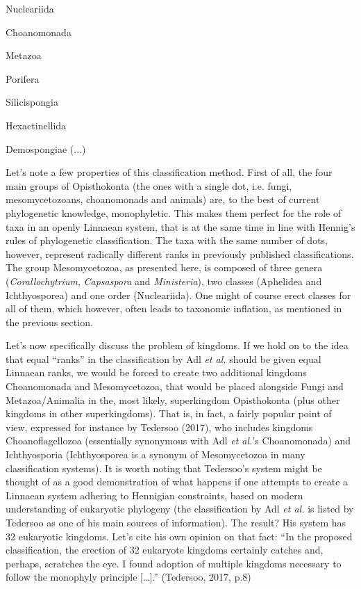 \begin{artengenv}
 Nucleariida

 Choanomonada

 Metazoa

 Porifera

 Silicispongia

 Hexactinellida

 Demospongiae (...)

Let’s note a few properties of this classification method. First of all, the four main groups of Opisthokonta
(the ones with a single dot, i.e. fungi, mesomycetozoans, choanomonads and animals) are, to the best of current
phylogenetic knowledge, monophyletic. This makes them perfect for the role of taxa in an openly Linnaean system, that
is at the same time in line with Hennig’s rules of phylogenetic classification. The taxa with the same number of dots,
however, represent radically different ranks in previously published classifications. The group Mesomycetozoa, as
presented here, is composed of three genera (\textit{Corallochytrium}, \textit{Capsaspora} and \textit{Ministeria}),
two classes (Aphelidea and Ichthyosporea) and one order (Nucleariida). One might of course erect classes for all of
them, which however, often leads to taxonomic inflation, as mentioned in the previous section.

Let’s now specifically discuss the problem of kingdoms. If we hold on to the idea that equal “ranks” in the
classification by Adl \textit{et al.} should be given equal Linnaean ranks, we would be forced to create two additional
kingdoms Choanomonada and Mesomycetozoa, that would be placed alongside Fungi and Metazoa/Animalia in the, most likely,
superkingdom Opisthokonta (plus other kingdoms in other superkingdoms). That is, in fact, a fairly popular point of
view, expressed for instance by Tedersoo \label{ref:RNDXAoIqIPayD}(2017), who includes kingdoms Choanoflagellozoa
(essentially synonymous with Adl \textit{et al.}’s Choanomonada) and Ichthyosporia (Ichthyosporea is a synonym of
Mesomycetozoa in many classification systems). It is worth noting that Tedersoo’s system might be thought of as a good
demonstration of what happens if one attempts to create a Linnaean system adhering to Hennigian constraints, based on
modern understanding of eukaryotic phylogeny (the classification by Adl \textit{et al.} is listed by Tedersoo as one of
his main sources of information). The result? His system has 32 eukaryotic kingdoms. Let’s cite his own opinion on that
fact: “In the proposed classification, the erection of 32 eukaryote kingdoms certainly catches and, perhaps, scratches
the eye. I found adoption of multiple kingdoms necessary to follow the monophyly principle […].”
\label{ref:RNDP7J0D4JTk6}(Tedersoo, 2017, p.8)


\end{artengenv}
